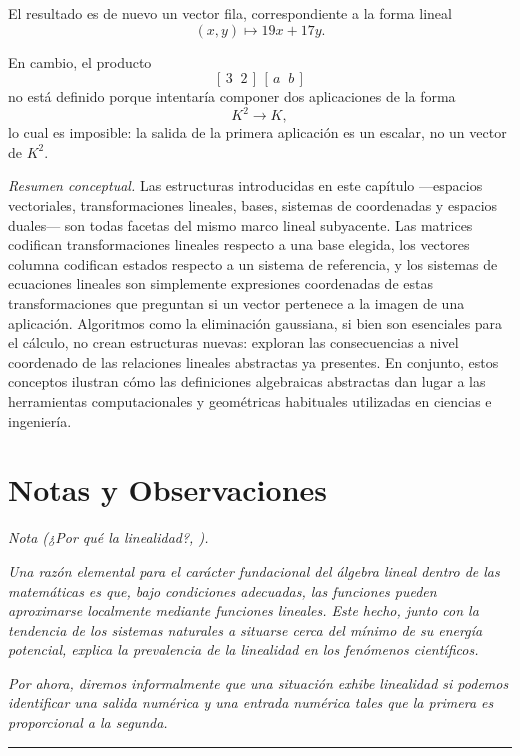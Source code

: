 El resultado es de nuevo un vector fila, correspondiente a la forma lineal
\[
(x,y)\longmapsto 19x+17y.
\]

\medskip

En cambio, el producto
\[
[\,3\;\;2\,]\,[\,a\;\;b\,]
\]
no está definido porque intentaría componer dos aplicaciones de la forma
\[
K^2 \to K,
\]
lo cual es imposible: la salida de la primera aplicación es un escalar, no un vector de $K^2$.

\bigskip

\textit{Resumen conceptual.} Las estructuras introducidas en este capítulo ---espacios vectoriales, transformaciones lineales, bases, sistemas de coordenadas y espacios duales--- son todas facetas del mismo marco lineal subyacente. Las matrices codifican transformaciones lineales respecto a una base elegida, los vectores columna codifican estados respecto a un sistema de referencia, y los sistemas de ecuaciones lineales son simplemente expresiones coordenadas de estas transformaciones que preguntan si un vector pertenece a la imagen de una aplicación. Algoritmos como la eliminación gaussiana, si bien son esenciales para el cálculo, no crean estructuras nuevas: exploran las consecuencias a nivel coordenado de las relaciones lineales abstractas ya presentes. En conjunto, estos conceptos ilustran cómo las definiciones algebraicas abstractas dan lugar a las herramientas computacionales y geométricas habituales utilizadas en ciencias e ingeniería.

\section*{Notas y Observaciones}

\textit{Nota (¿Por qué la linealidad?, \cite{oxford}).}

\textit{Una razón elemental para el carácter fundacional del álgebra lineal dentro de las matemáticas es que, bajo condiciones adecuadas, las funciones pueden aproximarse localmente mediante funciones lineales. Este hecho, junto con la tendencia de los sistemas naturales a situarse cerca del mínimo de su energía potencial, explica la prevalencia de la linealidad en los fenómenos científicos.}

\medskip

\textit{Por ahora, diremos informalmente que una situación exhibe linealidad si podemos identificar una salida numérica y una entrada numérica tales que la primera es proporcional a la segunda.}

\bigskip
\hrule
\medskip

